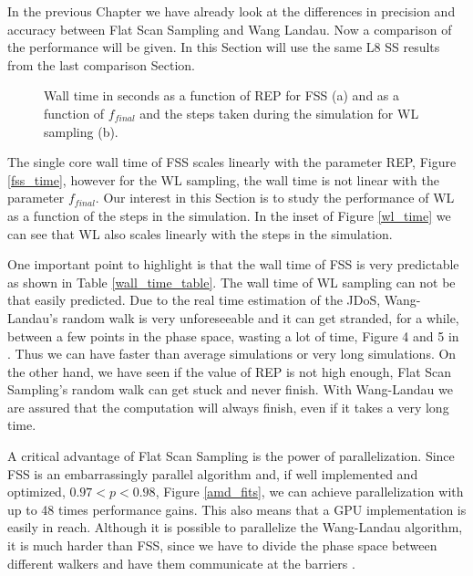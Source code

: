 	In the previous Chapter we have already look at the differences in precision and accuracy between Flat Scan Sampling and Wang Landau. Now a comparison of the performance will be given. In this Section will use the same L8 SS results from the last comparison Section.
		
\begin{figure}[h]
	\centering
	\caption{Wall time in seconds as a function of REP for FSS (a) and as a function of $f_{final}$ and the steps taken during the simulation for WL sampling (b).}
\end{figure}

	The single core wall time of FSS scales linearly with the parameter REP, Figure \ref{fss_time}, however for the WL sampling, the wall time is not linear with the parameter $f_{final}$. Our interest in this Section is to study the performance of WL as a function of the steps in the simulation. In the inset of Figure \ref{wl_time} we can see that WL also scales linearly with the steps in the simulation.
	
	One important point to highlight is that the wall time of FSS is very predictable as shown in Table \ref{wall_time_table}. The wall time of WL sampling can not be that easily predicted. Due to the real time estimation of the JDoS, Wang-Landau's random walk is very unforeseeable and it can get stranded, for a while, between a few points in the phase space, wasting a lot of time, Figure 4 and 5 in \cite{Nguyen2006}. Thus we can have faster than average simulations or very long simulations. 
	On the other hand, we have seen if the value of REP is not high enough, Flat Scan Sampling's random walk can get stuck and never finish. With Wang-Landau we are assured that the computation will always finish, even if it takes a very long time.

	A critical advantage of Flat Scan Sampling is the power of parallelization. Since FSS is an embarrassingly parallel algorithm and, if well implemented and optimized, $0.97<p<0.98$, Figure \ref{amd_fits}, we can achieve parallelization with up to 48 times performance gains. This also means that a GPU implementation is easily in reach. Although it is possible to parallelize the Wang-Landau algorithm, it is much harder than FSS, since we have to divide the phase space between different walkers and have them communicate at the barriers \cite{Yin2012}.

